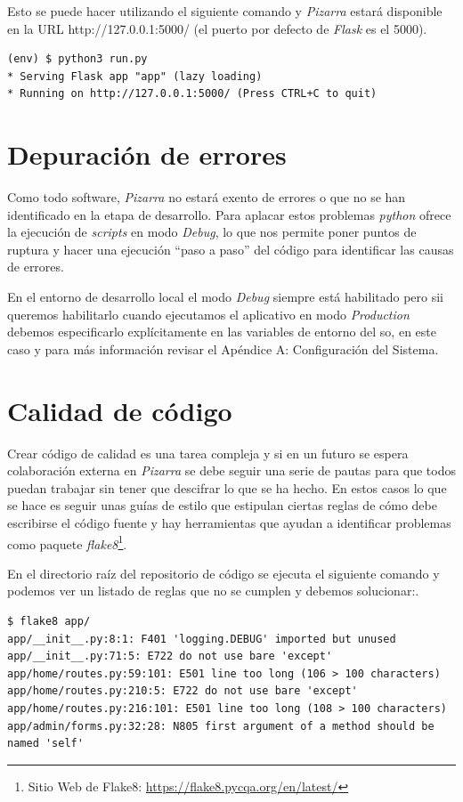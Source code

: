 \documentclass[11pt,spanish,listoffigures,listoftables]{tfgetsinf}
\begin{document}
Esto se puede hacer utilizando el siguiente comando y \textit{Pizarra} estará disponible en la URL http://127.0.0.1:5000/ (el puerto por defecto de \textit{Flask} es el 5000). \newline

\begin{lstlisting}[style=ascii-tree]
(env) $ python3 run.py 
* Serving Flask app "app" (lazy loading)
* Running on http://127.0.0.1:5000/ (Press CTRL+C to quit)
\end{lstlisting}

\section{Depuración de errores}

Como todo software, \textit{Pizarra} no estará exento de errores o  que no se han identificado en la etapa de desarrollo. Para aplacar estos problemas \textit{python} ofrece la ejecución de \textit{scripts} en modo \textit{Debug}, lo que nos permite poner puntos de ruptura y hacer una ejecución ``paso a paso'' del código para identificar las causas de errores.

En el entorno de desarrollo local el modo \textit{Debug} siempre está habilitado pero sii queremos habilitarlo cuando ejecutamos el aplicativo en modo \textit{Production} debemos especificarlo explícitamente en las variables de entorno del \acrshort{so}, en este caso y para más información revisar el Apéndice A: Configuración del Sistema.

\section{Calidad de código}

Crear código de calidad es una tarea compleja y si en un futuro se espera colaboración externa en \textit{Pizarra} se debe seguir una serie de pautas para que todos puedan trabajar sin tener que descifrar lo que se ha hecho. En estos casos lo que se hace es seguir unas guías de estilo que estipulan ciertas reglas de cómo debe escribirse el código fuente y hay herramientas que ayudan a identificar problemas como \Gls{paquete} \textit{flake8}\footnote{Sitio Web de Flake8: \url{https://flake8.pycqa.org/en/latest/}}.

En el directorio raíz del repositorio de código se ejecuta el siguiente comando y podemos ver un listado de reglas que no se cumplen y debemos solucionar:.

\begin{lstlisting}[style=ascii-tree]
$ flake8 app/
app/__init__.py:8:1: F401 'logging.DEBUG' imported but unused
app/__init__.py:71:5: E722 do not use bare 'except'
app/home/routes.py:59:101: E501 line too long (106 > 100 characters)
app/home/routes.py:210:5: E722 do not use bare 'except'
app/home/routes.py:216:101: E501 line too long (108 > 100 characters)
app/admin/forms.py:32:28: N805 first argument of a method should be named 'self'
\end{lstlisting}
\end{document}
